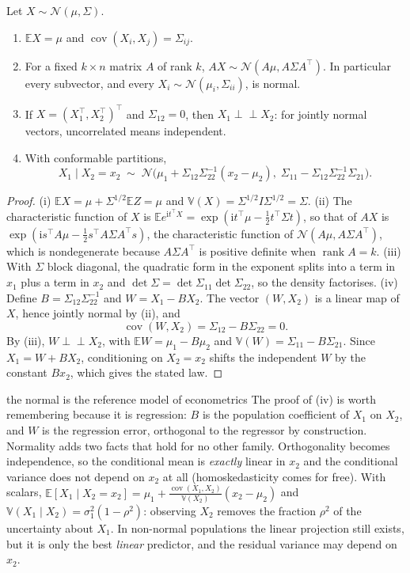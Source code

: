 \documentclass[11pt,a4paper]{article}
\newcommand{\E}{\mathbb{E}}
\newcommand{\V}{\mathbb{V}}
\newcommand{\N}{\mathcal{N}}
\newcommand{\Cov}{\operatorname{cov}}
\newcommand{\rank}{\operatorname{rank}}
\newcommand{\indep}{\perp\!\!\!\perp}
\begin{document}
\begin{theorem}\label{thm:normal}
Let $X\sim\N(\mu,\Sigma)$.
\begin{enumerate}[label=\textup{(\roman*)}]
\item $\E X=\mu$ and $\Cov(X_i,X_j)=\Sigma_{ij}$.
\item For a fixed $k\times n$ matrix $A$ of rank $k$, $AX\sim\N(A\mu,A\Sigma A^\top)$. In particular every subvector, and every $X_i\sim\N(\mu_i,\Sigma_{ii})$, is normal.
\item If $X=(X_1^\top,X_2^\top)^\top$ and $\Sigma_{12}=0$, then $X_1\indep X_2$: for jointly normal vectors, uncorrelated means independent.
\item With conformable partitions,
\[
X_1\mid X_2=x_2\;\sim\;\N\big(\mu_1+\Sigma_{12}\Sigma_{22}^{-1}(x_2-\mu_2),\;\Sigma_{11}-\Sigma_{12}\Sigma_{22}^{-1}\Sigma_{21}\big).
\]
\end{enumerate}
\end{theorem}

\begin{proof}
(i) $\E X=\mu+\Sigma^{1/2}\E Z=\mu$ and $\V(X)=\Sigma^{1/2}I\Sigma^{1/2}=\Sigma$. (ii) The characteristic function of $X$ is $\E e^{\mathrm i t^\top X}=\exp(\mathrm it^\top\mu-\frac12t^\top\Sigma t)$, so that of $AX$ is $\exp(\mathrm is^\top A\mu-\frac12s^\top A\Sigma A^\top s)$, the characteristic function of $\N(A\mu,A\Sigma A^\top)$, which is nondegenerate because $A\Sigma A^\top$ is positive definite when $\rank A=k$. (iii) With $\Sigma$ block diagonal, the quadratic form in the exponent splits into a term in $x_1$ plus a term in $x_2$ and $\det\Sigma=\det\Sigma_{11}\det\Sigma_{22}$, so the density factorises. (iv) Define $B=\Sigma_{12}\Sigma_{22}^{-1}$ and $W=X_1-BX_2$. The vector $(W,X_2)$ is a linear map of $X$, hence jointly normal by (ii), and
\[
\Cov(W,X_2)=\Sigma_{12}-B\Sigma_{22}=0 .
\]
By (iii), $W\indep X_2$, with $\E W=\mu_1-B\mu_2$ and $\V(W)=\Sigma_{11}-B\Sigma_{21}$. Since $X_1=W+BX_2$, conditioning on $X_2=x_2$ shifts the independent $W$ by the constant $Bx_2$, which gives the stated law.
\end{proof}

\begin{whybox}{the normal is the reference model of econometrics}
The proof of (iv) is worth remembering because it is regression: $B$ is the population coefficient of $X_1$ on $X_2$, and $W$ is the regression error, orthogonal to the regressor by construction. Normality adds two facts that hold for no other family. Orthogonality becomes independence, so the conditional mean is \emph{exactly} linear in $x_2$ and the conditional variance does not depend on $x_2$ at all (homoskedasticity comes for free). With scalars, $\E[X_1\mid X_2=x_2]=\mu_1+\frac{\Cov(X_1,X_2)}{\V(X_2)}(x_2-\mu_2)$ and $\V(X_1\mid X_2)=\sigma_1^2(1-\rho^2)$: observing $X_2$ removes the fraction $\rho^2$ of the uncertainty about $X_1$. In non-normal populations the linear projection still exists, but it is only the best \emph{linear} predictor, and the residual variance may depend on $x_2$.
\end{whybox}
\end{document}
